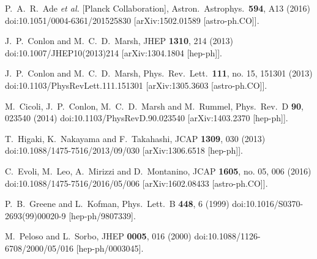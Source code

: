\documentclass[12pt, a4paper]{article}
\begin{document}
\begin{thebibliography}{99}
  P.~A.~R.~Ade {\it et al.} [Planck Collaboration],
  Astron.\ Astrophys.\  {\bf 594}, A13 (2016)
  doi:10.1051/0004-6361/201525830
  [arXiv:1502.01589 [astro-ph.CO]].
  
  J.~P.~Conlon and M.~C.~D.~Marsh,
  JHEP {\bf 1310}, 214 (2013)
  doi:10.1007/JHEP10(2013)214
  [arXiv:1304.1804 [hep-ph]].
  
  J.~P.~Conlon and M.~C.~D.~Marsh,
  Phys.\ Rev.\ Lett.\  {\bf 111}, no. 15, 151301 (2013)
  doi:10.1103/PhysRevLett.111.151301
  [arXiv:1305.3603 [astro-ph.CO]].
  
  M.~Cicoli, J.~P.~Conlon, M.~C.~D.~Marsh and M.~Rummel,
  Phys.\ Rev.\ D {\bf 90}, 023540 (2014)
  doi:10.1103/PhysRevD.90.023540
  [arXiv:1403.2370 [hep-ph]].
  
  T.~Higaki, K.~Nakayama and F.~Takahashi,
  JCAP {\bf 1309}, 030 (2013)
  doi:10.1088/1475-7516/2013/09/030
  [arXiv:1306.6518 [hep-ph]].
  
  C.~Evoli, M.~Leo, A.~Mirizzi and D.~Montanino,
  JCAP {\bf 1605}, no. 05, 006 (2016)
  doi:10.1088/1475-7516/2016/05/006
  [arXiv:1602.08433 [astro-ph.CO]].
  
  P.~B.~Greene and L.~Kofman,
  Phys.\ Lett.\ B {\bf 448}, 6 (1999)
  doi:10.1016/S0370-2693(99)00020-9
  [hep-ph/9807339].
  
  M.~Peloso and L.~Sorbo,
  JHEP {\bf 0005}, 016 (2000)
  doi:10.1088/1126-6708/2000/05/016
  [hep-ph/0003045].
  

\end{thebibliography}
\end{document}
